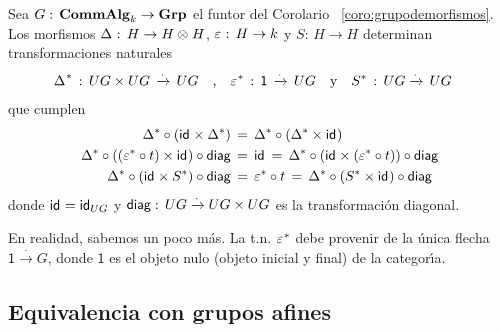 \begin{coroGrupoDeMorfismos}\label{coro:grupodemorfismos:grupoenlacategoria}
	Sea $G:\,\CommAlg[k]\rightarrow\Grp$ el funtor del Corolario~%
	\ref{coro:grupodemorfismos}. Los morfismos
	$\coproducto:\,H\rightarrow H\tensor H$, $\counidad:\,H\rightarrow k$ y
	$S:\,H\rightarrow H$ determinan transformaciones naturales
	\begin{align*}
		\pull\coproducto\,:\,
			UG\times UG\,\xrightarrow{\cdot}\,UG
		& \quad\text{,}\quad
		\pull\counidad\,:\,\mathsf 1\,\xrightarrow{\cdot}\,UG
		\quad\text{y}\quad
		\pull S\,:\,UG\xrightarrow{\cdot}\,UG
	\end{align*}
	que cumplen
	\begin{equation}
		\label{eq:grupodemorfismos}
		\begin{aligned}
			\pull\Delta\circ(\id\times\pull\Delta) & \,=\,
				\pull\Delta\circ(\pull\Delta\times\id) \\
			\pull\Delta\circ((\pull\varepsilon\circ t)\times\id)
				\circ\diag & \,=\,\id
				\,=\, \pull\Delta\circ
					(\id\times (\pull\varepsilon\circ t))
					\circ\diag \\
			\pull\Delta\circ(\id\times\pull S)\circ\diag & \,=\,
				\pull\varepsilon\circ t
				\,=\, \pull\Delta\circ(\pull S\times\id)
					\circ\diag
		\end{aligned}
	\end{equation}
	donde $\id=\id[UG]$ y $\diag:\,UG\xrightarrow\cdot UG\times UG$
	es la transformaci\'{o}n diagonal.
\end{coroGrupoDeMorfismos}

\begin{obsProductosEnGrupos}\label{obs:productosengrupos:objetoterminal}
	En realidad, sabemos un poco m\'{a}s. La t.n. $\pull\counidad$ debe
	provenir de la \'{u}nica flecha $\mathsf 1\xrightarrow\cdot G$,
	donde $\mathsf 1$ es el objeto nulo (objeto inicial y final) de la
	categor\'{\i}a.
\end{obsProductosEnGrupos}

\subsection{Equivalencia con grupos afines}%
	\label{subsec:gruposafines:equivalencia}

